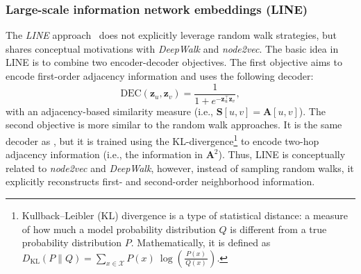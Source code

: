 \subsubsection{Large-scale information network embeddings (LINE)}
The \textit{LINE} approach~\cite{Tang2015line} does not explicitly leverage random walk strategies, but shares conceptual motivations with \textit{DeepWalk} and \textit{node2vec}. The basic idea in LINE is to combine two encoder-decoder objectives. The first objective aims to encode first-order adjacency information and uses the following decoder:
\begin{equation*}
    \text{DEC}(\mathbf{z}_u, \mathbf{z}_v) = \frac{1}{1 + e^{-\mathbf{z}_u^\top\mathbf{z}_v}},
\end{equation*}
with an adjacency-based similarity measure (i.e., $\textbf{S}[u,v] = \mathbf{A}[u,v]$). The second objective is more similar to the random walk approaches. It is the same decoder as , but it is trained using the KL-divergence\footnote{Kullback–Leibler (KL) divergence is a type of statistical distance: a measure of how much a model probability distribution $Q$ is different from a true probability distribution $P$. Mathematically, it is defined as $D_{\text{KL}}(P\parallel Q)=\sum_{x\in {\mathcal{X}}}P(x)\ \log \left({\frac{\ P(x)\ }{Q(x)}}\right)$.} to encode two-hop adjacency information (i.e., the information in $\mathbf{A}^2$). Thus, LINE is conceptually related to \textit{node2vec} and \textit{DeepWalk}, however, instead of sampling random walks, it explicitly reconstructs first- and second-order neighborhood information.


